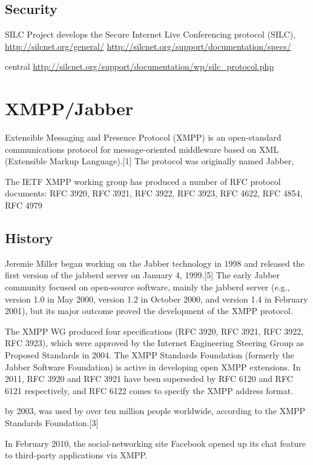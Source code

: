 \subsection{Security}

SILC Project develops the Secure Internet Live Conferencing protocol (SILC),
\url{http://silcnet.org/general/}
\url{http://silcnet.org/support/documentation/specs/}

central
\url{http://silcnet.org/support/documentation/wp/silc_protocol.php}


\section{XMPP/Jabber}
Extensible Messaging and Presence Protocol (XMPP) is an open-standard communications protocol for message-oriented middleware based on XML (Extensible Markup Language).[1] The protocol was originally named Jabber,


The IETF XMPP working group has produced a number of RFC protocol documents: RFC 3920, RFC 3921, RFC 3922, RFC 3923, RFC 4622, RFC 4854, RFC 4979

\subsection{History}
Jeremie Miller began working on the Jabber technology in 1998 and released the first version of the jabberd server on January 4, 1999.[5] The early Jabber community focused on open-source software, mainly the jabberd server (e.g., version 1.0 in May 2000, version 1.2 in October 2000, and version 1.4 in February 2001), but its major outcome proved the development of the XMPP protocol.

The XMPP WG produced four specifications (RFC 3920, RFC 3921, RFC 3922, RFC 3923), which were approved by the Internet Engineering Steering Group as Proposed Standards in 2004. The XMPP Standards Foundation (formerly the Jabber Software Foundation) is active in developing open XMPP extensions. In 2011, RFC 3920 and RFC 3921 have been superseded by RFC 6120 and RFC 6121 respectively, and RFC 6122 comes to specify the XMPP address format.

by 2003, was used by over ten million people worldwide, according to the XMPP Standards Foundation.[3]

In February 2010, the social-networking site Facebook opened up its chat feature to third-party applications via XMPP.

